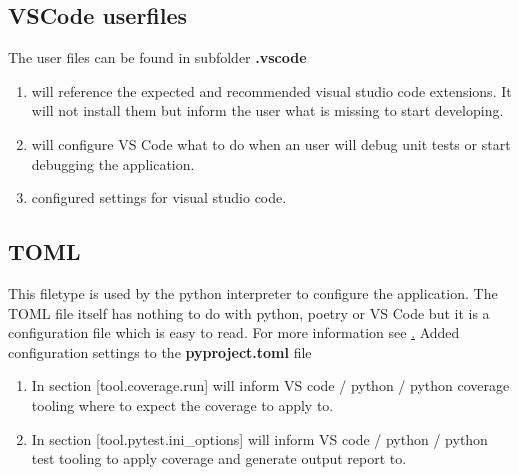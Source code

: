 \subsection{VSCode userfiles}
The user files can be found in subfolder \textbf{.vscode}
\begin{enumerate}
	\item {} will reference the expected and recommended visual studio code extensions. It will not install them but inform the user what is missing to start developing.
	\item {} will configure VS Code what to do when an user will debug unit tests or start debugging the application.
	\item {} configured settings for visual studio code.
\end{enumerate}

\subsection{TOML}
This filetype is used by the python interpreter to configure the application. The TOML file itself has nothing to do with python, poetry or VS Code but it is a configuration file which is easy to read. For more information see \href{https://coverage.readthedocs.io/en/latest/config.html#toml-syntax}.
Added configuration settings to the \textbf{pyproject.toml} file
\begin{enumerate}
	\item In section [tool.coverage.run]  will inform VS code / python / python coverage tooling where to expect the coverage to apply to.
	\item In section [tool.pytest.ini\_options]  will inform VS code / python / python test tooling to apply coverage and generate output report to.
\end{enumerate}


